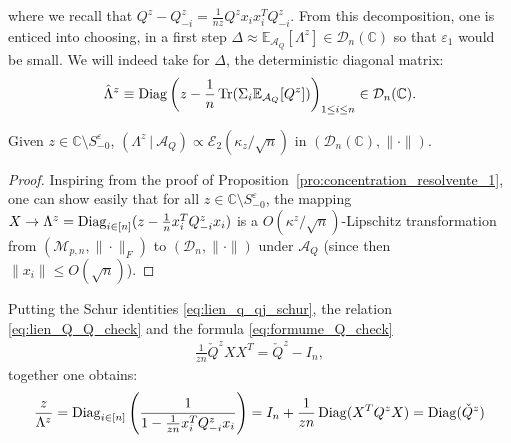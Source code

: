 \documentclass[a4papaer, titlepage]{book}
\begin{document}
where we recall that $Q^z - Q^z_{-i} = \frac{1}{nz}Q^zx_i x_i^TQ_{-i}^z$.
From this decomposition, one is enticed into choosing, in a first step $\Delta \approx \mathbb E_{\mathcal A_Q}[\Lambda^z] \in \mathcal D_n(\mathbb C)$ so that $\varepsilon_1$ would be small. We will indeed take for $\Delta$, the deterministic diagonal matrix: 
$$\hat \Lambda^z \equiv
 \operatorname{Diag} \left( z - \frac{1}{n} \operatorname{Tr}(\Sigma_i\mathbb E_{\mathcal A_Q}[Q^z]) \right)_{1\leq i \leq n} \in \mathcal D_n(\mathbb C).$$ 
\begin{lemma}\label{lem:Concentration_lambda}
  Given $z\in \mathbb C \setminus S_{-0}^\varepsilon$, $(\Lambda^z \ | \ \mathcal A_Q) \propto \mathcal E_2(\kappa_z/\sqrt n)$ in $(\mathcal D_n(\mathbb C), \| \cdot \|)$.
\end{lemma}
\begin{proof}
  Inspiring from the proof of Proposition~\ref{pro:concentration_resolvente_1}, one can show easily that for all $z \in \mathbb C \setminus S_{-0}^\varepsilon$, the mapping $X \to \Lambda^z = \operatorname{Diag}_{i \in [n]}(z - \frac{1}{n}x_i^T Q_{-i}^zx_i)$ is a $O(\kappa^z/\sqrt n)$-Lipschitz transformation from $(\mathcal{M}_{p,n}, \| \cdot \|_F)$ to $(\mathcal D_n, \| \cdot \|)$  under $\mathcal A_Q$ (since then $\|x_i\| \leq O(\sqrt n)$). 
\end{proof}
Putting the Schur identities \eqref{eq:lien_q_qj_schur}, the relation \eqref{eq:lien_Q_Q_check} and the formula \eqref{eq:formume_Q_check}
\begin{align}\label{eq:formume_Q_check}
  \frac{1}{zn}\check Q^zXX^T =  \check Q^ z - I_n,
\end{align}
together one obtains:
\begin{align}\label{eq:link_lambda_cQ}
   \frac{z}{\Lambda^z}
   =\diag_{i\in [n]}\left(\frac{1}{1- \frac1{zn}x_i^TQ^z_{-i}x_i}\right) %
  = I_n + \frac{1}{zn}\diag(X^TQ^zX) = \diag(\check Q^z)
\end{align}
\end{document}
